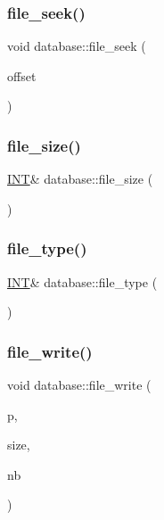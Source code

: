 \subsubsection{\texorpdfstring{file\+\_\+seek()}{file\_seek()}}
{\footnotesize\ttfamily void database\+::file\+\_\+seek (\begin{DoxyParamCaption}\item[{\mbox{\hyperlink{galois_8h_a09fddde158a3a20bd2dcadb609de11dc}{I\+NT}}}]{offset }\end{DoxyParamCaption})}

\mbox{\label{classdatabase_a8547ac1fa93cdcd8ec464cac1ec24c5d}} 
\subsubsection{\texorpdfstring{file\+\_\+size()}{file\_size()}}
{\footnotesize\ttfamily \mbox{\hyperlink{galois_8h_a09fddde158a3a20bd2dcadb609de11dc}{I\+NT}}\& database\+::file\+\_\+size (\begin{DoxyParamCaption}{ }\end{DoxyParamCaption})\hspace{0.3cm}{\ttfamily [inline]}}

\mbox{\label{classdatabase_a9dce80d625548b03b8317641b674cd9b}} 
\subsubsection{\texorpdfstring{file\+\_\+type()}{file\_type()}}
{\footnotesize\ttfamily \mbox{\hyperlink{galois_8h_a09fddde158a3a20bd2dcadb609de11dc}{I\+NT}}\& database\+::file\+\_\+type (\begin{DoxyParamCaption}{ }\end{DoxyParamCaption})\hspace{0.3cm}{\ttfamily [inline]}}

\mbox{\label{classdatabase_a42d32ba51ad8ccd2a0adfd1a147f6230}} 
\subsubsection{\texorpdfstring{file\+\_\+write()}{file\_write()}}
{\footnotesize\ttfamily void database\+::file\+\_\+write (\begin{DoxyParamCaption}\item[{void $\ast$}]{p,  }\item[{\mbox{\hyperlink{galois_8h_a09fddde158a3a20bd2dcadb609de11dc}{I\+NT}}}]{size,  }\item[{\mbox{\hyperlink{galois_8h_a09fddde158a3a20bd2dcadb609de11dc}{I\+NT}}}]{nb }\end{DoxyParamCaption})}

